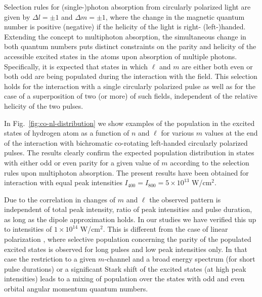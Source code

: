 Selection rules for (single-)photon absorption from circularly polarized light are given by $\Delta l = \pm 1$ and $\Delta m = \pm 1$, where the change in the magnetic quantum number is positive (negative) if the helicity of the light is right- (left-)handed. Extending the concept to multiphoton absorption, the simultaneous change in both quantum numbers puts distinct constraints on the parity and helicity of the accessible excited states in the atoms upon absorption of multiple photons. Specifically, it is expected that states in which $\ell$ and $m$ are either both even or both odd are being populated during the interaction with the field. This selection holds for the interaction with a single circularly polarized pulse as well as for the case of a superposition of two (or more) of such fields, independent of the relative helicity of the two pulses. 

In Fig.~\ref{fig:co-nl-distribution} we show examples of the population in the excited states of hydrogen atom as a function of $n$ and $\ell$ for various $m$ values at the end of the interaction with bichromatic co-rotating left-handed circularly polarized pulses. The results clearly confirm the expected population distribution in states with either odd or even parity for a given value of $m$ according to the selection rules upon multiphoton absorption. The present results have been obtained for interaction with equal peak intensities $I_{400} = I_{800} = 5\times 10^{13}$ W/cm$^2$. 

Due to the correlation in changes of $m$ and $\ell$ the observed pattern is independent of total peak intensity, ratio of peak intensities and pulse duration, as long as the dipole approximation holds. In our studies we have verified this up to intensities of $1 \times 10^{14}$ W/cm$^2$. This is different from the case of linear polarization \cite{venzke2018_ryd}, where selective population concerning the parity of the populated excited states is observed for long pulses and low peak intensities only. In that case the restriction to a given $m$-channel and a broad energy spectrum (for short pulse durations) or a significant Stark shift of the excited states (at high peak intensities) leads to a mixing of population over the states with odd and even orbital angular momentum quantum numbers.


